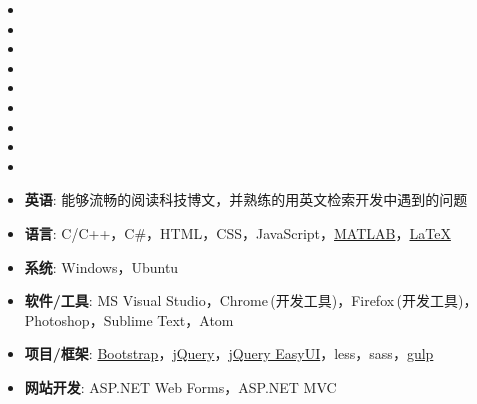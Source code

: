 \documentclass[letterpaper,11pt]{article}
\begin{document}
  \begin{itemize}[leftmargin=*]
    \item {}
    \item {}
    \item {}
    \item {}
    \item {}
    \item {}
    \item {}
    \item {}
    \item {}
  \end{itemize}

  \begin{itemize}[leftmargin=*]
    \item \textbf{英语}: 能够流畅的阅读科技博文，并熟练的用英文检索开发中遇到的问题
    \item \textbf{语言}: C/C++，C\#，HTML，CSS，JavaScript，\href{http://cn.mathworks.com/products/matlab/}{MATLAB}，\href{http://www.latex-project.org/}{\LaTeX}
    \item \textbf{系统}: Windows，Ubuntu
    \item \textbf{软件/工具}: MS Visual Studio，Chrome$\,$(开发工具)，Firefox$\,$(开发工具)，Photoshop，Sublime Text，Atom
    \item \textbf{项目/框架}: \href{http://www.bootcss.com/}{Bootstrap}，\href{https://jquery.com/}{jQuery}，\href{http://jeasyui.com/}{jQuery EasyUI}，less，sass，\href{http://gulpjs.com/}{gulp}
    \item \textbf{网站开发}: ASP.NET Web Forms，ASP.NET MVC
  \end{itemize}

\end{document}
